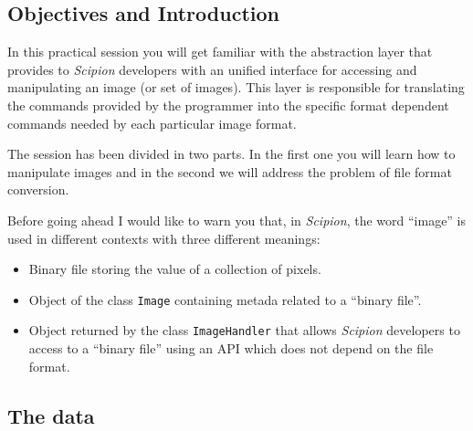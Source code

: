 \documentclass[12pt]{article} %
\def\scipion{\textit{Scipion}\xspace}
\newcommand{\ttt}[1]{\texttt{#1}}
\begin{document}
\subsection{Objectives and Introduction}


In this practical session you will get familiar with the abstraction layer that provides to \scipion developers with an unified interface for accessing and manipulating an image (or set of images). This layer is responsible for translating the commands provided by the programmer into the specific format dependent commands needed by each particular image format.

The session has been divided in two parts. In the first one you will learn how to manipulate images and in the second we will address the problem of file format conversion.

Before going ahead I would like to warn you that, in \scipion,  the word ``image''  is used in different contexts with three different meanings:

\begin{itemize}
 \item Binary file storing the value of a collection of pixels. 
 \item Object of the class \ttt{Image} containing metada related to a ``binary file''.
 \item Object returned by the class \ttt{ImageHandler} that allows \scipion developers to access to a ``binary file'' using an API which does not depend on the file format.
\end{itemize}

\subsection{The data}
\end{document}
